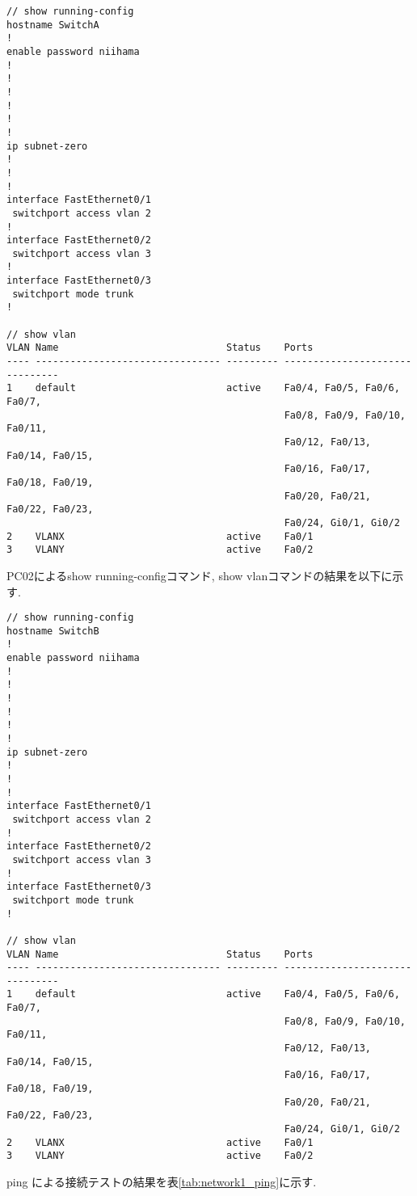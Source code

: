 \documentclass{jsarticle}
\begin{document}
\begin{lstlisting}[basicstyle=\ttfamily\small, frame=single]
// show running-config
hostname SwitchA
!
enable password niihama
!
!
!
!
!
!
ip subnet-zero
!
!
!
interface FastEthernet0/1
 switchport access vlan 2
!
interface FastEthernet0/2
 switchport access vlan 3
!
interface FastEthernet0/3
 switchport mode trunk
!

// show vlan 
VLAN Name                             Status    Ports
---- -------------------------------- --------- -------------------------------
1    default                          active    Fa0/4, Fa0/5, Fa0/6, Fa0/7,
                                                Fa0/8, Fa0/9, Fa0/10, Fa0/11,
                                                Fa0/12, Fa0/13, Fa0/14, Fa0/15,
                                                Fa0/16, Fa0/17, Fa0/18, Fa0/19,
                                                Fa0/20, Fa0/21, Fa0/22, Fa0/23,
                                                Fa0/24, Gi0/1, Gi0/2
2    VLANX                            active    Fa0/1
3    VLANY                            active    Fa0/2
\end{lstlisting}

PC02によるshow running-configコマンド, show vlanコマンドの結果を以下に示す. 

\begin{lstlisting}[basicstyle=\ttfamily\small, frame=single]
// show running-config
hostname SwitchB
!
enable password niihama
!
!
!
!
!
!
ip subnet-zero
!
!
!
interface FastEthernet0/1
 switchport access vlan 2
!
interface FastEthernet0/2
 switchport access vlan 3
!
interface FastEthernet0/3
 switchport mode trunk
!

// show vlan 
VLAN Name                             Status    Ports
---- -------------------------------- --------- -------------------------------
1    default                          active    Fa0/4, Fa0/5, Fa0/6, Fa0/7,
                                                Fa0/8, Fa0/9, Fa0/10, Fa0/11,
                                                Fa0/12, Fa0/13, Fa0/14, Fa0/15,
                                                Fa0/16, Fa0/17, Fa0/18, Fa0/19,
                                                Fa0/20, Fa0/21, Fa0/22, Fa0/23,
                                                Fa0/24, Gi0/1, Gi0/2
2    VLANX                            active    Fa0/1
3    VLANY                            active    Fa0/2
\end{lstlisting}
\vspace{1mm}
ping による接続テストの結果を表\ref{tab:network1_ping}に示す. 
\end{document}
